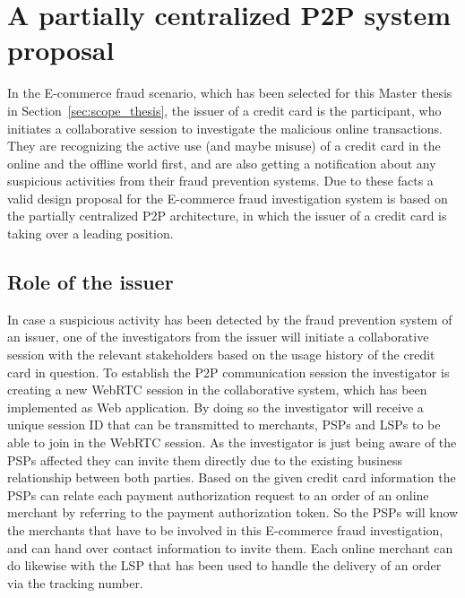 
\section{A partially centralized \gls{P2P} system proposal}
\label{sec:p2p_partially_centralized_system}

In the \gls{E-commerce} fraud scenario, which has been selected for this Master thesis in Section~\ref{sec:scope_thesis}, the issuer of a credit card is the participant, who initiates a collaborative session to investigate the malicious online transactions. They are recognizing the active use (and maybe misuse) of a credit card in the online and the offline world first, and are also getting a notification about any suspicious activities from their fraud prevention systems. Due to these facts a valid design proposal for the \gls{E-commerce} fraud investigation system is based on the partially centralized \gls{P2P} architecture, in which the issuer of a credit card is taking over a leading position.

\subsection{Role of the issuer}
\label{subsec:p2p_partially_issuer_collecting}

In case a suspicious activity has been detected by the fraud prevention system of an issuer, one of the investigators from the issuer will initiate a collaborative session with the relevant stakeholders based on the usage history of the credit card in question. To establish the \gls{P2P} communication session the investigator is creating a new \gls{WebRTC} session in the collaborative system, which has been implemented as Web application. By doing so the investigator will receive a unique session ID that can be transmitted to merchants, \gls{PSP}s and \gls{LSP}s to be able to join in the \gls{WebRTC} session. As the investigator is just being aware of the \gls{PSP}s affected they can invite them directly due to the existing business relationship between both parties. Based on the given credit card information the \gls{PSP}s can relate each payment authorization request to an order of an online merchant by referring to the payment authorization token. So the \gls{PSP}s will know the merchants that have to be involved in this \gls{E-commerce} fraud investigation, and can hand over contact information to invite them. Each online merchant can do likewise with the \gls{LSP} that has been used to handle the delivery of an order via the tracking number. \\

